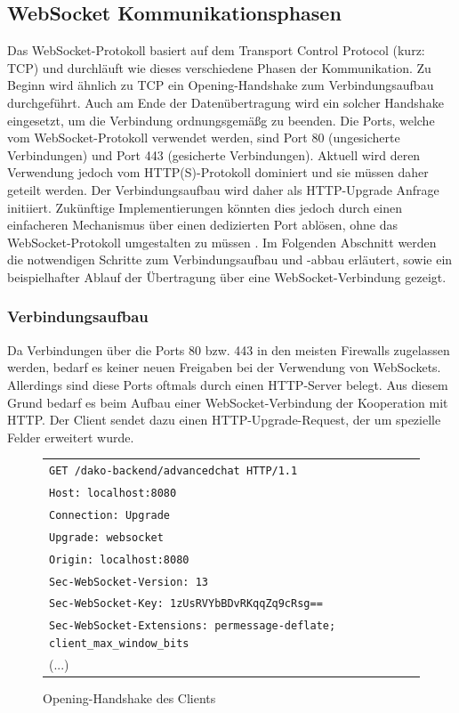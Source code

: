 \documentclass[11pt,a4paper,titlepage]{scrartcl}
\numberwithin{equation}{section}
\begin{document}
\subsection{WebSocket Kommunikationsphasen}\label{subsec:wsLifecycle}
Das WebSocket-Protokoll basiert auf dem Transport Control Protocol (kurz: TCP) und durchläuft wie dieses verschiedene Phasen der Kommunikation. Zu Beginn wird ähnlich zu TCP ein Opening-Handshake zum Verbindungsaufbau durchgeführt. Auch am Ende der Datenübertragung wird ein solcher Handshake eingesetzt, um die Verbindung ordnungsgemäßg zu beenden. Die Ports, welche vom WebSocket-Protokoll verwendet werden, sind Port 80 (ungesicherte Verbindungen) und Port 443 (gesicherte Verbindungen). Aktuell wird deren Verwendung jedoch vom HTTP(S)-Protokoll dominiert und sie müssen daher geteilt werden. Der Verbindungsaufbau wird daher als HTTP-Upgrade Anfrage initiiert. Zukünftige Implementierungen könnten dies jedoch durch einen einfacheren Mechanismus über einen dedizierten Port ablösen, ohne das WebSocket-Protokoll umgestalten zu müssen \autocite[3]{fette_websocket_2011}. Im Folgenden Abschnitt werden die notwendigen Schritte zum Verbindungsaufbau und -abbau erläutert, sowie ein beispielhafter Ablauf der Übertragung über eine WebSocket-Verbindung gezeigt.

\subsubsection{Verbindungsaufbau}\label{subsubsec:wsOpen}
Da Verbindungen über die Ports 80 bzw. 443 in den meisten Firewalls zugelassen werden, bedarf es keiner neuen Freigaben bei der Verwendung von WebSockets. Allerdings sind diese Ports oftmals durch einen HTTP-Server belegt. Aus diesem Grund bedarf es beim Aufbau einer WebSocket-Verbindung der Kooperation mit HTTP. Der Client sendet dazu einen HTTP-Upgrade-Request, der um spezielle Felder erweitert wurde.

\begin{figure}[ht]
	\begin{center}
		\begin{tabular}{l}
		\texttt{GET /dako-backend/advancedchat HTTP/1.1} \\
		\texttt{Host: localhost:8080} \\
		\texttt{Connection: Upgrade} \\
		\texttt{Upgrade: websocket} \\
		\texttt{Origin: localhost:8080} \\
		\texttt{Sec-WebSocket-Version: 13}\\
		\texttt{Sec-WebSocket-Key: 1zUsRVYbBDvRKqqZq9cRsg==}\\
		\texttt{Sec-WebSocket-Extensions: permessage-deflate; client\_max\_window\_bits}\\
		(...)\vspace{-5mm}
		\end{tabular}
	\end{center}
	\caption{Opening-Handshake des Clients}
	\label{fig:wsOpenHandshakeClient}
\end{figure}
\end{document}
